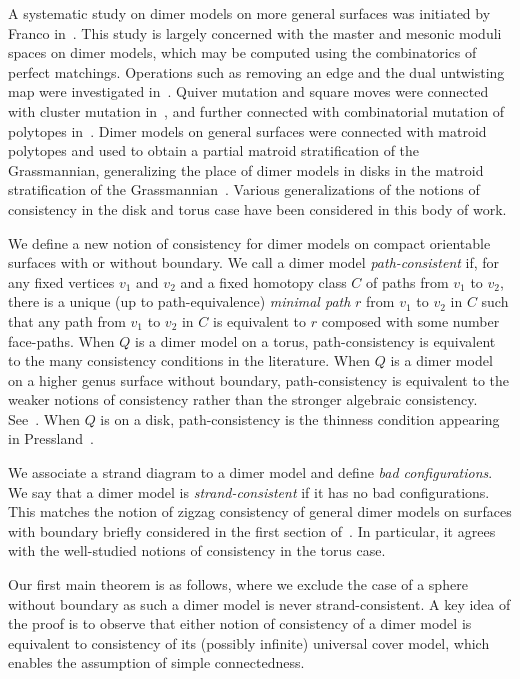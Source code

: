 \documentclass{article}
\theoremstyle{definition}
\begin{document}
{A systematic study on dimer models on more general surfaces was initiated by Franco in~\cite{BFTFDBPTSA}. This study is largely concerned with the master and mesonic moduli spaces on dimer models, which may be computed using the combinatorics of perfect matchings.
Operations such as removing an edge and the dual untwisting map were investigated in~\cite{BFTFDBPTSA,NDIBFT,BFTFDB}. Quiver mutation and square moves were connected with cluster mutation in~\cite{CTFBFT}, and further connected with combinatorial mutation of polytopes in~\cite{Twin}.
Dimer models on general surfaces were connected with matroid polytopes and used to obtain a partial matroid stratification of the Grassmannian, generalizing the place of dimer models in disks in the matroid stratification of the Grassmannian~\cite{TGOOSD, BFTCAATG, NPOSD, SOSCVTGONPOSD, HCCAQFTD}.
Various generalizations of the notions of consistency in the disk and torus case have been considered in this body of work.} 

\nocite{BBMTCYFADQ}
\nocite{BFTDBI}
\nocite{BFT2}
\nocite{BB}

We define a new notion of consistency for dimer models on compact orientable surfaces with or without boundary.
We call a dimer model \textit{path-consistent} if, for any fixed vertices $v_1$ and $v_2$ and a fixed homotopy class $C$ of paths from $v_1$ to $v_2$, there is a unique (up to path-equivalence) \textit{minimal path} $r$ from $v_1$ to $v_2$ in $C$ such that any path from $v_1$ to $v_2$ in $C$ is equivalent to $r$ composed with some number face-paths. When $Q$ is a dimer model on a torus, path-consistency is equivalent to the many consistency conditions in the literature. When $Q$ is a dimer model on a higher genus surface without boundary, path-consistency is equivalent to the weaker notions of consistency rather than the stronger algebraic consistency. See~\cite[Theorem 10.2]{XBocklandt2011}. When $Q$ is on a disk, path-consistency is the thinness condition appearing in Pressland~\cite{XPressland2019}.

We associate a strand diagram to a dimer model and define \textit{bad configurations}. We say that a dimer model is \textit{strand-consistent} if it has no bad configurations. This matches the notion of zigzag consistency of general dimer models on surfaces with boundary briefly considered in the first section of~\cite{XBocklandt2015}. In particular, it agrees with the well-studied notions of consistency in the torus case.

Our first main theorem is as follows, where we exclude the case of a sphere without boundary as such a dimer model is never strand-consistent.  A key idea of the proof is to observe that either notion of consistency of a dimer model is equivalent to consistency of its (possibly infinite) universal cover model, which enables the assumption of simple connectedness.
\end{document}
